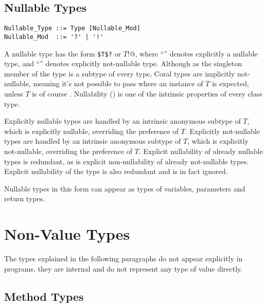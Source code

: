 \subsection{Nullable Types}
\label{sec:nullable-types}

\syntax\begin{lstlisting}
Nullable_Type ::= Type [Nullable_Mod]
Nullable_Mod  ::= '?' | '!'
\end{lstlisting}

A nullable type has the form \lstinline!$T$?! or \lstinline@$T$!@, where ``'' denotes explicitly a nullable type, and ``\code{!}'' denotes explicitly not-nullable type. Although  as the singleton member of the  type is a subtype of every type, Coral types are implicitly not-nullable, meaning it's not possible to pass  where an instance of $T$ is expected, unless $T$ is of course . Nullability () is one of the intrinsic properties of every class type. 

Explicitly nullable types are handled by an intrinsic anonymous subtype of $T$, which is explicitly nullable, overriding the preference of $T$. Explicitly not-nullable types are handled by an intrinsic anonymous subtype of $T$, which is explicitly not-nullable, overriding the preference of $T$. Explicit nullability of already nullable types is redundant, as is explicit non-nullability of already not-nullable types. Explicit nullability of the  type is also redundant and is in fact ignored. 

Nullable types in this form can appear as types of variables, parameters and return types. 





\section{Non-Value Types}

The types explained in the following paragraphs do not appear explicitly in programs, they are internal and do not represent any type of value directly. 






\subsection{Method Types}
\label{sec:method-types}

